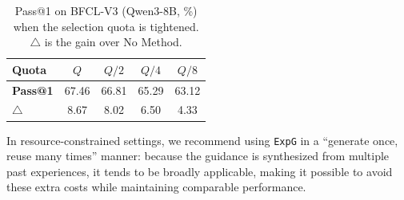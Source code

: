 \documentclass[11pt]{article}
\newcommand{\ours}{\texttt{ExpG}}
\begin{document}
\begin{table}[t]
\centering
\caption{\small Pass@1 on BFCL-V3 (Qwen3-8B, \%) when the selection quota is tightened. $\triangle$ is the gain over No Method.}
\label{tab:quota_budget}
\vspace{-1mm}
\fontsize{8}{9.5}\selectfont
\setlength{\tabcolsep}{3pt}
\begin{tabular}{@{}lcccc@{}}
\toprule
\textbf{Quota} & $Q$ & $Q/2$ & $Q/4$ & $Q/8$ \\
\midrule
\textbf{Pass@1} & 67.46 & 66.81 & 65.29 & 63.12 \\
$\triangle$ & 8.67 & 8.02 & 6.50 & 4.33 \\
\bottomrule
\end{tabular}
\vspace{-2mm}
\end{table}

In resource-constrained settings, we recommend using {\ours} in a ``generate once, reuse many times'' manner: because the guidance is synthesized from multiple past experiences, it tends to be broadly applicable, making it possible to avoid these extra costs while maintaining comparable performance.



% 
\end{document}
